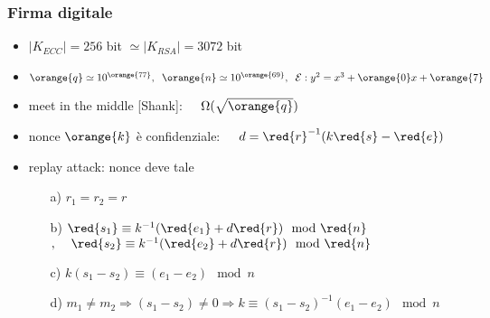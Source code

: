\begin{frame}
	\frametitle{Firma digitale}
	
	\begin{itemize}
		\item $|K_{ECC}|=256$ bit $\simeq |K_{RSA}|=3072 $ bit
		\item $\orange{q}\simeq 10^{\orange{77}},\;\;\orange{n}\simeq 10^{\orange{69}},
				\;\;\mathcal{E}:y^2=x^3+\orange{0}x+\orange{7}$
	\end{itemize}
	
	\begin{itemize}
	  	\item {\color{blue} meet in the middle} [Shank]: $\;\;\;\;\Omega(\sqrt{\orange{q}})$
		\item nonce $\orange{k}$ è confidenziale: $\;\;\;\;d=\red{r}^{-1}(k\red{s}-\red{e})$
		\item {\color{blue} replay attack:} nonce deve tale
		\begin{enumerate}%
		  	\item[a)] $r_1=r_2=r$
			\item[b)] $\red{s_1}\equiv k^{-1}(\red{e_1}+d\red{r})\mod \red{n}$ 
					  $,\;\;\;\; \red{s_2}\equiv k^{-1}(\red{e_2}+d\red{r})\mod \red{n}$
			\item[c)] $k(s_1-s_2)\equiv(e_1-e_2)\mod n$
			\item[d)] $m_1\neq m_2 \Rightarrow (s_1-s_2)\neq 0\Rightarrow
			k\equiv(s_1-s_2)^{-1}(e_1-e_2)\mod n$
		\end{enumerate}
	\end{itemize} 

\end{frame}
